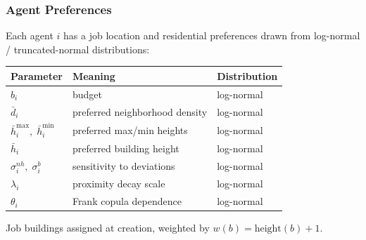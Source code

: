 \documentclass{beamer}
\begin{document}
\begin{frame}
  \frametitle{Agent Preferences}
  Each agent $i$ has a job location and residential preferences drawn from
  log-normal / truncated-normal distributions:
  \vspace{0.3em}
  \begin{center}
  \begin{tabular}{lll}
    \toprule
    \textcolor{nimbygray}{Parameter} & \textcolor{nimbygray}{Meaning} & \textcolor{nimbygray}{Distribution} \\
    \midrule
    $b_i$ & budget & log-normal \\
    $\bar{d}_i$ & preferred neighborhood density & log-normal \\
    $\bar{h}^{\max}_i,\; \bar{h}^{\min}_i$ & preferred max/min heights & log-normal \\
    $\bar{h}_i$ & preferred building height & log-normal \\
    $\sigma^{nh}_i,\; \sigma^{b}_i$ & sensitivity to deviations & log-normal \\
    $\lambda_i$ & proximity decay scale & log-normal \\
    $\theta_i$ & Frank copula dependence & log-normal \\
    \bottomrule
  \end{tabular}
  \end{center}
  \vspace{0.4em}
  \small Job buildings assigned at creation, weighted by $w(b) = \text{height}(b) + 1$.
\end{frame}
\end{document}
